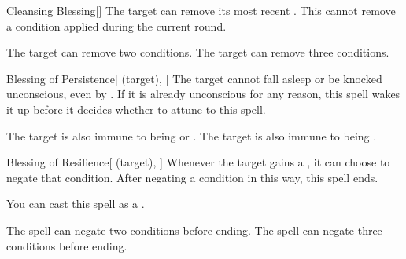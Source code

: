 \lowercase{\hypertarget{spell:Cleansing Blessing}{}}\label{spell:Cleansing Blessing}
\begin{freeability}[Rank 3]{\hypertarget{spell:Cleansing Blessing}{Cleansing Blessing}}[]
The target can remove its most recent .
This cannot remove a condition applied during the current round.

\rankline
{} The target can remove two conditions.
 The target can remove three conditions.
\end{freeability}
\vspace{0.25em}



\lowercase{\hypertarget{spell:Blessing of Persistence}{}}\label{spell:Blessing of Persistence}
\begin{attuneability}[Rank 4]{\hypertarget{spell:Blessing of Persistence}{Blessing of Persistence}}[ (target), ]
The target cannot fall asleep or be knocked unconscious, even by .
If it is already unconscious for any reason, this spell wakes it up before it decides whether to attune to this spell.


\rankline
{} The target is also immune to being  or .
 The target is also immune to being .
\end{attuneability}
\vspace{0.25em}



\lowercase{\hypertarget{spell:Blessing of Resilience}{}}\label{spell:Blessing of Resilience}
\begin{attuneability}[Rank 4]{\hypertarget{spell:Blessing of Resilience}{Blessing of Resilience}}[ (target), ]
Whenever the target gains a , it can choose to negate that condition.
After negating a condition in this way, this spell ends.

You can cast this spell as a .

\rankline
{} The spell can negate two conditions before ending.
 The spell can negate three conditions before ending.
\end{attuneability}
\vspace{0.25em}



